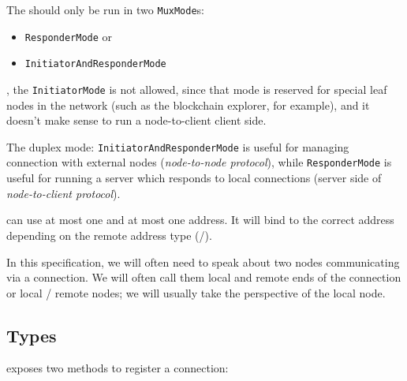 The \connmngr{} should only be run in two \texttt{MuxMode}s:

\begin{itemize}
  \item \texttt{ResponderMode} or
  \item \texttt{InitiatorAndResponderMode}
\end{itemize}

\noindent, the \texttt{InitiatorMode} is not allowed, since that mode is reserved for
special leaf nodes in the network (such as the blockchain explorer, for example), and it doesn't make
sense to run a node-to-client client side.

The duplex mode: \texttt{InitiatorAndResponderMode} is useful for managing
connection with external nodes (\textit{node-to-node protocol}), while
\texttt{ResponderMode} is useful for running a server which responds to local
connections (server side of \textit{node-to-client protocol}).


\Connmngr{} can use at most one \ipvfour{} and at most one \ipvsix{}
address. It will bind to the correct address depending on the remote address
type (\ipvfour{}/\ipvsix{}).

In this specification, we will often need to speak about two nodes communicating
via a \TCP{} connection.  We will often call them local and remote ends of the
connection or local \slash{} remote nodes; we will usually take the
perspective of the local node.


\subsection{Types} %

\Connmngr{} exposes two methods to register a connection:

